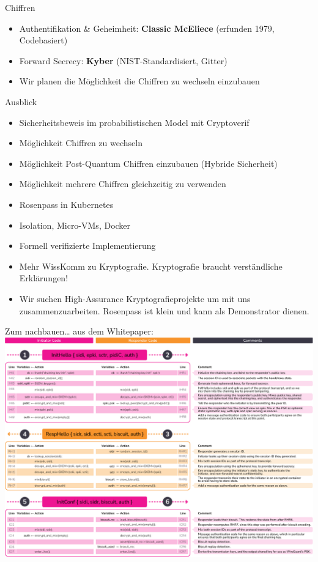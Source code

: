 \documentclass{rosenpass-beamer}
\begin{document}
\begin{frame}{Chiffren}
  \begin{itemize}
    \item Authentifikation \& Geheimheit: \textbf{Classic McEliece} (erfunden 1979, Codebasiert)
    \item Forward Secrecy: \textbf{Kyber} (NIST-Standardisiert, Gitter)
    \item Wir planen die Möglichkeit die Chiffren zu wechseln einzubauen
  \end{itemize}
\end{frame}

\begin{frame}{Ausblick}
  \begin{itemize}
    \item Sicherheitsbeweis im probabilistischen Model mit Cryptoverif
    \item Möglichkeit Chiffren zu wechseln
    \item Möglichkeit Post-Quantum Chiffren einzubauen (Hybride Sicherheit)
    \item Möglichkeit mehrere Chiffren gleichzeitig zu verwenden
    \item Rosenpass in Kubernetes
    \item Isolation, Micro-VMs, Docker
    \item Formell verifizierte Implementierung
    \item Mehr WissKomm zu Kryptografie. Kryptografie braucht verständliche Erklärungen!
  \end{itemize}
  \begin{itemize}
    \item Wir suchen High-Assurance Kryptografieprojekte um mit uns zusammenzuarbeiten. Rosenpass ist klein und kann als Demonstrator dienen.
  \end{itemize}
\end{frame}

\begin{frame}{Zum nachbauen… aus dem Whitepaper:}
  \includegraphics[height=.9\textheight]{graphics/rosenpass-wp-message-handling-code.pdf}
\end{frame}
\end{document}
